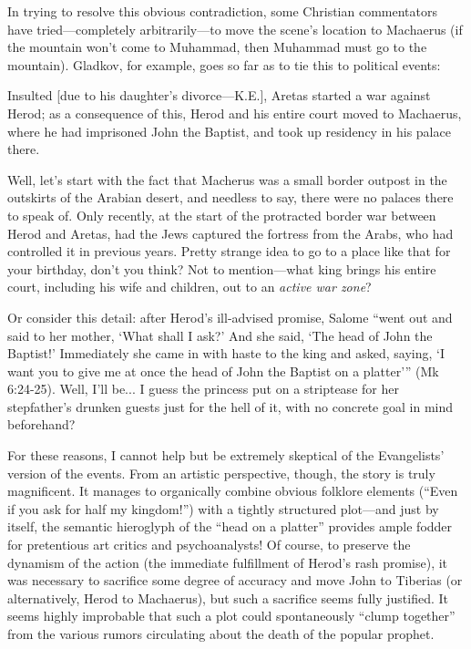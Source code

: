 In trying to resolve this obvious contradiction, some Christian commentators have tried---completely arbitrarily---to move the scene's location to Machaerus (if the mountain won't come to Muhammad, then Muhammad must go to the mountain). Gladkov, for example, goes so far as to tie this to political events:

\begin{smallquote}
    Insulted [due to his daughter's divorce---K.E.], Aretas started a war against Herod; as a consequence of this, Herod and his entire court moved to Machaerus, where he had imprisoned John the Baptist, and took up residency in his palace there.
\end{smallquote}
Well, let's start with the fact that Macherus was a small border outpost in the outskirts of the Arabian desert, and needless to say, there were no palaces there to speak of. Only recently, at the start of the protracted border war between Herod and Aretas, had the Jews captured the fortress from the Arabs, who had controlled it in previous years. Pretty strange idea to go to a place like that for your birthday, don't you think? Not to mention---what king brings his entire court, including his wife and children, out to an \emph{active war zone}?

Or consider this detail: after Herod's ill-advised promise, Salome ``went out and said to her mother, `What shall I ask?' And she said, `The head of John the Baptist!' Immediately she came in with haste to the king and asked, saying, `I want you to give me at once the head of John the Baptist on a platter''' (Mk 6:24-25). Well, I'll be... I guess the princess put on a striptease for her stepfather's drunken guests just for the hell of it, with no concrete goal in mind beforehand?

For these reasons, I cannot help but be extremely skeptical of the Evangelists' version of the events. From an artistic perspective, though, the story is truly magnificent. It manages to organically combine obvious folklore elements (``Even if you ask for half my kingdom!'') with a tightly structured plot---and just by itself, the semantic hieroglyph of the ``head on a platter'' provides ample fodder for pretentious art critics and psychoanalysts! Of course, to preserve the dynamism of the action (the immediate fulfillment of Herod's rash promise), it was necessary to sacrifice some degree of accuracy and move John to Tiberias (or alternatively, Herod to Machaerus), but such a sacrifice seems fully justified. It seems highly improbable that such a plot could spontaneously ``clump together'' from the various rumors circulating about the death of the popular prophet.

